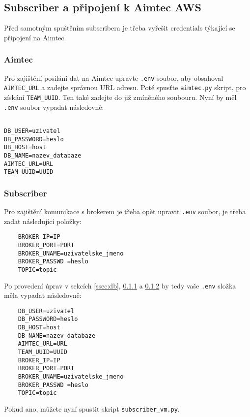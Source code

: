 \subsection{Subscriber a připojení k Aimtec AWS}
Před samotným spuštěním subscribera je třeba vyřešit credentials týkající se připojení na Aimtec.
\subsubsection{Aimtec}
\label{sssec:aimtec}
Pro zajištění posílání dat na Aimtec upravte \verb|.env| soubor, aby obsahoval \verb|AIMTEC_URL| a zadejte správnou URL adresu. Poté spusťte \verb|aimtec.py| skript, pro získání \verb|TEAM_UUID|. Ten také zadejte do již zmíněného soubouru.
Nyní by měl \verb|.env| soubor vypadat následovně:
\begin{verbatim}
    
DB_USER=uzivatel
DB_PASSWORD=heslo
DB_HOST=host
DB_NAME=nazev_databaze
AIMTEC_URL=URL
TEAM_UUID=UUID
\end{verbatim}
\subsubsection{Subscriber}
\label{sssec:subscriber}
Pro zajištění komunikace s brokerem je třeba opět upravit \verb|.env| soubor, je třeba zadat následující položky:
\begin{verbatim}
    BROKER_IP=IP
    BROKER_PORT=PORT  
    BROKER_UNAME=uzivatelske_jmeno
    BROKER_PASSWD =heslo
    TOPIC=topic
\end{verbatim}
Po provedení úprav v sekcích \ref{ssec:db}, \ref{sssec:aimtec} a \ref{sssec:subscriber} by tedy vaše \verb|.env| složka měla vypadat následovně: 

\begin{verbatim}
    DB_USER=uzivatel
    DB_PASSWORD=heslo
    DB_HOST=host
    DB_NAME=nazev_databaze
    AIMTEC_URL=URL
    TEAM_UUID=UUID
    BROKER_IP=IP
    BROKER_PORT=PORT  
    BROKER_UNAME=uzivatelske_jmeno
    BROKER_PASSWD =heslo
    TOPIC=topic
\end{verbatim}
Pokud ano, můžete nyní spustit skript \verb|subscriber_vm.py|. 

